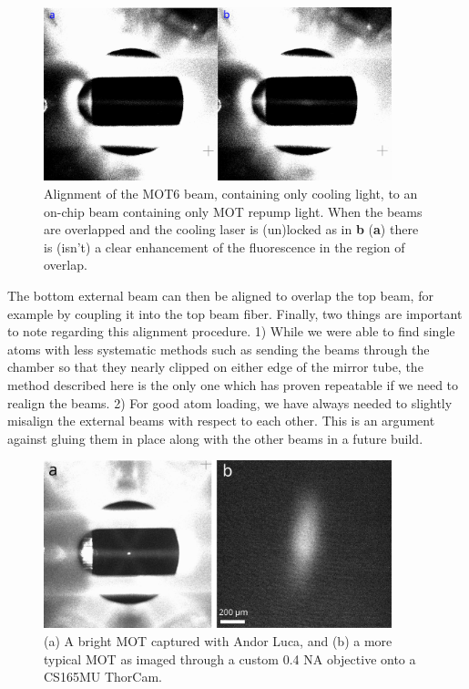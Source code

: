 \begin{figure}[!ht]
    \centering
    \includegraphics[width=0.9\textwidth]{Images/mot6_alignment_to_repump.pdf}
    \caption{Alignment of the MOT6 beam, containing only cooling 
    light, to an on-chip beam containing only MOT repump light. When the 
    beams are overlapped and the cooling laser is (un)locked as in \textbf{b} (\textbf{a}) there is (isn't) a clear enhancement of the 
    fluorescence in the region of overlap.}
    \label{fig:external_beam_alignment}
\end{figure}
The bottom external beam can then be aligned to overlap the top beam, for example by coupling it into the top beam fiber. Finally, two things are important to note regarding this alignment procedure. 1) While we were able to find single atoms with less systematic methods such as sending the beams through the chamber so that they nearly clipped on either edge of the mirror tube, the method described here is the only one which has proven repeatable if we need to realign the beams. 2) For good atom loading, we have always needed to slightly misalign the external beams with respect to each other. This is an argument against gluing them in place along with the other beams in a future build.
\begin{figure}[!ht]
    \centering
    \includegraphics[width=0.9\textwidth]{Images/large_mot_and_thorcam_mot.pdf}
    \caption{(a) A bright MOT captured with Andor Luca, and (b) a more typical MOT 
    as imaged through a custom 0.4 NA objective onto a 
    CS165MU ThorCam.}
    \label{fig:large_mot_and_thorcam_mot}
\end{figure}
